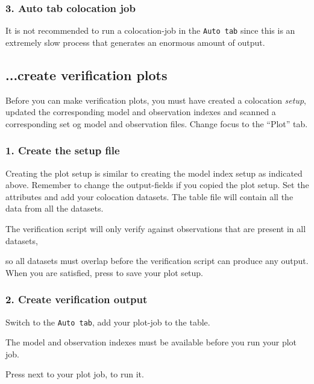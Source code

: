 \documentclass[letterpaper,10pt,twoside,twocolumn,openany]{book}
\begin{document}
{\subsubsection{3. Auto tab colocation job}
It is not recommended to run a colocation-job in the \lstinline!Auto tab! since this 
is an extremely slow process that generates an enormous amount of output.

\subsection{...create verification plots}
Before you can make verification plots, you must have
created a colocation {\em setup}, 
updated the corresponding model and observation indexes and
scanned a corresponding set og model and observation files.
Change focus to the ``Plot'' tab.

\subsubsection{1. Create the setup file} 
Creating the plot setup is similar to creating the model index setup as indicated above. 
Remember to change the output-fields if you copied the plot setup.
Set the attributes and add your colocation datasets. 
The table file will contain all the data from all the datasets. 
\begin{quotebox}
The verification script will only verify against observations that are present in all datasets, 
\end{quotebox}
so all datasets must overlap before the verification script can produce any output.
When you are satisfied, press  to save your plot setup.

\subsubsection{2. Create verification output} 
Switch to the \lstinline!Auto tab!, add your plot-job to the table.
\begin{quotebox}
  The model and observation indexes must be available before you run your plot job.
\end{quotebox}
Press  next to your plot job, to run it.

}
\end{document}
